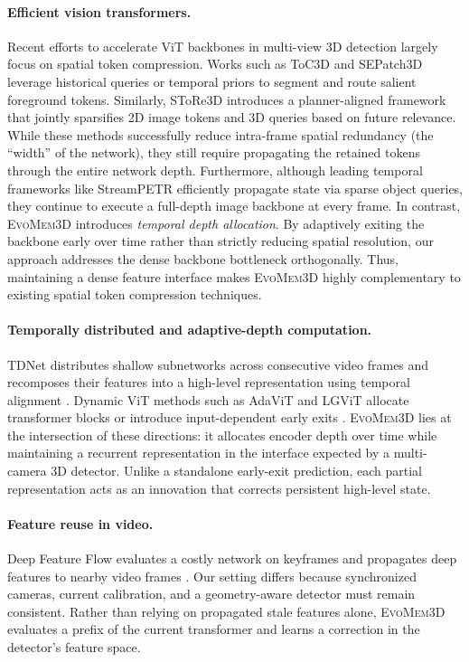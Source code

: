 \documentclass[10pt,twocolumn,letterpaper]{article}
\newcommand{\method}{\textsc{EvoMem3D}}
\begin{document}
\paragraph{Efficient vision transformers.}
Recent efforts to accelerate ViT backbones in multi-view 3D detection largely focus on spatial token compression. Works such as ToC3D \cite{zhang2024toc3d} and SEPatch3D  \cite{SEPatch3D} leverage historical queries or temporal priors to segment and route salient foreground tokens. Similarly, SToRe3D \cite{store3d} introduces a planner-aligned framework that jointly sparsifies 2D image tokens and 3D queries based on future relevance. While these methods successfully reduce intra-frame spatial redundancy (the ``width'' of the network), they still require propagating the retained tokens through the entire network depth. Furthermore, although leading temporal frameworks like StreamPETR \cite{wang2023streampetr} efficiently propagate state via sparse object queries, they continue to execute a full-depth image backbone at every frame. In contrast, \method{} introduces \emph{temporal depth allocation}. By adaptively exiting the backbone early over time rather than strictly reducing spatial resolution, our approach addresses the dense backbone bottleneck orthogonally. Thus, maintaining a dense feature interface makes \method{} highly complementary to existing spatial token compression techniques.


\paragraph{Temporally distributed and adaptive-depth computation.}
TDNet distributes shallow subnetworks across consecutive video
frames and recomposes their features into a high-level representation
using temporal alignment \cite{hu2020tdnet}. Dynamic ViT methods such
as AdaViT and LGViT allocate transformer blocks or introduce
input-dependent early exits \cite{meng2021adavit,xu2023lgvit}.
\method{} lies at the intersection of these directions: it allocates
encoder depth over time while maintaining a recurrent representation
in the interface expected by a multi-camera 3D detector. Unlike a
standalone early-exit prediction, each partial representation acts as
an innovation that corrects persistent high-level state.


\paragraph{Feature reuse in video.}
Deep Feature Flow evaluates a costly network on keyframes and propagates deep features to nearby video frames \cite{zhu2017dff}. Our setting differs because synchronized cameras, current calibration, and a geometry-aware detector must remain consistent. Rather than relying on propagated stale features alone, \method{} evaluates a prefix of the current transformer and learns a correction in the detector's feature space.
\end{document}
